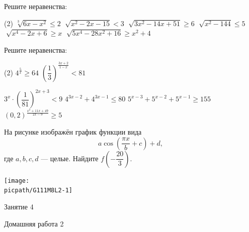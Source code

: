 \begin{class}[number=3]
	\begin{listofex}
		\item Решите неравенства: %
		\begin{tasks}(2)
			\task \( \sqrt[3]{6x-x^2} \le 2 \)
			\task \( \sqrt[]{x^2-2x-15}<3 \)
			\task \( \sqrt[]{3x^2-14x+51} \ge 6 \)
			\task \( \sqrt[]{x^2-144} \le 5 \)
			\task \( \sqrt[]{x^4-2x+6} \ge x \)
			\task \( \sqrt[]{5x^4-28x^2+16} \ge x^2+4 \)
		\end{tasks}
		\item Решите неравенства: %
		\begin{tasks}(2)
			\task \( 4^{\tfrac{5}{x}} \ge 64 \)
			\task \( \left( \dfrac{ 1 }{ 3 } \right)^{\tfrac{ 3x+2 }{ 1-x }} < 81 \)
			
			\task \( 3^x \cdot \left( \dfrac{ 1 }{ 81 } \right)^{2x+3} < 9 \)
			\task \( 4^{3x-2}+4^{3x-1} \le 80 \)
			\task \( 5^{x-3}+5^{x-2}+5^{x-1} \ge 155 \)
			\task \( (0,2)^{\tfrac{x^2+11x+49}{2x-9}} \ge 5 \)
		\end{tasks}
		\item
		\begin{minipage}[t]{\bodywidth}
			На рисунке изображён график функции вида \[ a\cos \left( \dfrac{ \pi x }{ b }+c \right)+d, \] где \(a,b,c, d\) --- целые. Найдите \(f\left( -\dfrac{ 20 }{ 3 } \right)\).
		\end{minipage}
		\hspace{0.02\linewidth}
		\begin{minipage}[t]{\picwidth}
			\texttt{[image: \\picpath/G111M8L2-1]}
		\end{minipage}
	\end{listofex}
\end{class}

\begin{class}[number=4]
	\begin{listofex}
		\item Занятие 4
	\end{listofex}
\end{class}

\begin{homework}[number=2]
	\begin{listofex}
		\item Домашняя работа 2
	\end{listofex}
\end{homework}

